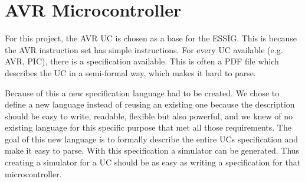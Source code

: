 \chapter{AVR Microcontroller}
For this project, the AVR \ac{UC} is chosen as a base for the \ac{ESSIG}. This
is because the AVR instruction set has simple instructions. For every \ac{UC}
available (e.g. AVR, PIC), there is a specification available. This is often a
PDF file which describes the \ac{UC} in a semi-formal way, which makes it hard
to parse.

Because of this a new specification language had to be created. We chose to
define a new language instead of reusing an existing one because the
description should be easy to write, readable, flexible but also powerful, 
and we knew of no
existing language for this specific purpose that met all those requirements. 
The goal of this new language is to formally describe the entire \ac{UC}s 
specification and make it easy to parse. With this specification a simulator 
can be generated. Thus creating a simulator for a \ac{UC} should be as easy 
as writing a specification for that microcontroller.
